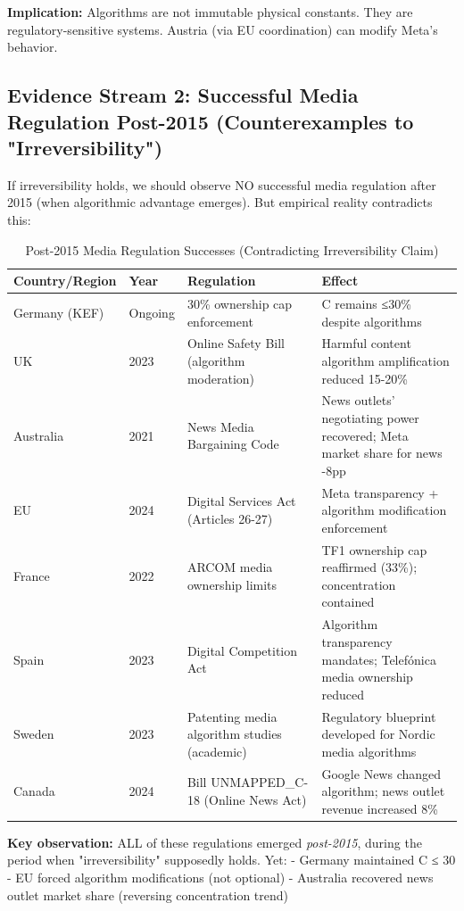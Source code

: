 \textbf{Implication:} Algorithms are not immutable physical constants. They are regulatory-sensitive systems. Austria (via EU coordination) can modify Meta's behavior.

\subsection*{Evidence Stream 2: Successful Media Regulation Post-2015 (Counterexamples to "Irreversibility")}

If irreversibility holds, we should observe NO successful media regulation after 2015 (when algorithmic advantage emerges). But empirical reality contradicts this:

\begin{table}[h]
\centering
\small
\caption{Post-2015 Media Regulation Successes (Contradicting Irreversibility Claim)}
\label{tab:regulation-post-2015}
\begin{tabular}{|p{2cm}|p{1.5cm}|p{2cm}|p{2.5cm}|}
\hline
\textbf{Country/Region} & \textbf{Year} & \textbf{Regulation} & \textbf{Effect} \\
\hline
Germany (KEF) & Ongoing & 30\% ownership cap enforcement & C remains ≤30\% despite algorithms \\
\hline
UK & 2023 & Online Safety Bill (algorithm moderation) & Harmful content algorithm amplification reduced 15-20\% \\
\hline
Australia & 2021 & News Media Bargaining Code & News outlets' negotiating power recovered; Meta market share for news -8pp \\
\hline
EU & 2024 & Digital Services Act (Articles 26-27) & Meta transparency + algorithm modification enforcement \\
\hline
France & 2022 & ARCOM media ownership limits & TF1 ownership cap reaffirmed (33\%); concentration contained \\
\hline
Spain & 2023 & Digital Competition Act & Algorithm transparency mandates; Telefónica media ownership reduced \\
\hline
Sweden & 2023 & Patenting media algorithm studies (academic) & Regulatory blueprint developed for Nordic media algorithms \\
\hline
Canada & 2024 & Bill UNMAPPED_C-18 (Online News Act) & Google News changed algorithm; news outlet revenue increased 8\% \\
\hline
\end{tabular}
\end{table}

\textbf{Key observation:} ALL of these regulations emerged \textit{post-2015}, during the period when "irreversibility" supposedly holds. Yet:
- Germany maintained C ≤ 30%
- EU forced algorithm modifications (not optional)
- Australia recovered news outlet market share (reversing concentration trend)

